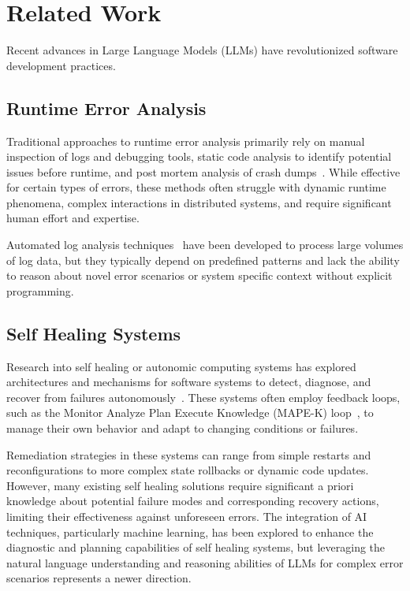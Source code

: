\section{Related Work}\label{sec:related-work}
Recent advances in Large Language Models (LLMs) have revolutionized software development practices.

\subsection{Runtime Error Analysis}
Traditional approaches to runtime error analysis primarily rely on manual inspection of logs and debugging tools, static code analysis to identify potential issues before runtime, and post mortem analysis of crash dumps~\cite{debugging_techniques_survey_2017, static_analysis_overview_2015}. While effective for certain types of errors, these methods often struggle with dynamic runtime phenomena, complex interactions in distributed systems, and require significant human effort and expertise. 

Automated log analysis techniques~\cite{log_analysis_survey_2016} have been developed to process large volumes of log data, but they typically depend on predefined patterns and lack the ability to reason about novel error scenarios or system specific context without explicit programming.

\subsection{Self Healing Systems}
Research into self healing or autonomic computing systems has explored architectures and mechanisms for software systems to detect, diagnose, and recover from failures autonomously~\cite{autonomic_computing_overview_2004, self_healing_survey_2012}. These systems often employ feedback loops, such as the Monitor Analyze Plan Execute Knowledge (MAPE-K) loop~\cite{mapek2003}, to manage their own behavior and adapt to changing conditions or failures.

Remediation strategies in these systems can range from simple restarts and reconfigurations to more complex state rollbacks or dynamic code updates. However, many existing self healing solutions require significant a priori knowledge about potential failure modes and corresponding recovery actions, limiting their effectiveness against unforeseen errors. The integration of AI techniques, particularly machine learning, has been explored to enhance the diagnostic and planning capabilities of self healing systems, but leveraging the natural language understanding and reasoning abilities of LLMs for complex error scenarios represents a newer direction.

